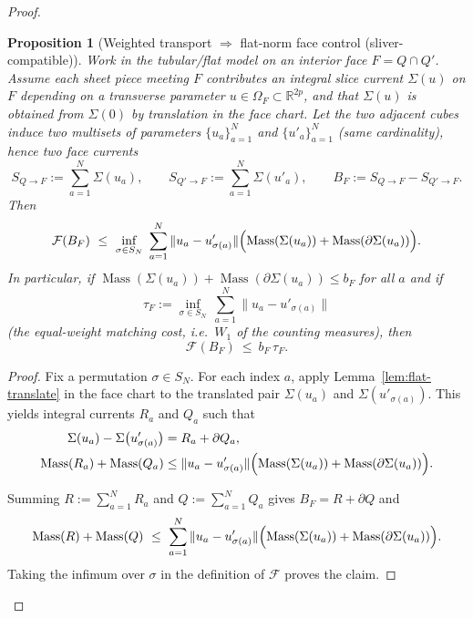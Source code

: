 \documentclass[11pt]{article}
\numberwithin{equation}{section}  %
\theoremstyle{plain}
\newtheorem{proposition}[theorem]{Proposition}
\theoremstyle{definition}
\theoremstyle{remark}
\newcommand{\R}{\mathbb{R}}
\DeclareMathOperator{\Mass}{Mass}
\begin{document}
\begin{proof}


\begin{proposition}[Weighted transport $\Rightarrow$ flat-norm face control (sliver-compatible)]\label{prop:transport-flat-glue-weighted}
Work in the tubular/flat model on an interior face $F=Q\cap Q'$.
Assume each sheet piece meeting $F$ contributes an integral slice current $\Sigma(u)$ on $F$ depending on a transverse parameter
$u\in\Omega_F\subset\R^{2p}$, and that $\Sigma(u)$ is obtained from $\Sigma(0)$ by translation in the face chart.
Let the two adjacent cubes induce two multisets of parameters $\{u_a\}_{a=1}^N$ and $\{u'_a\}_{a=1}^N$ (same cardinality), hence two face currents
\[
S_{Q\to F}:=\sum_{a=1}^N \Sigma(u_a),\qquad
S_{Q'\to F}:=\sum_{a=1}^N \Sigma(u'_a),
\qquad
B_F:=S_{Q\to F}-S_{Q'\to F}.
\]
Then
\[
\mathcal F(B_F)\ \le\ \inf_{\sigma\in S_N}\ \sum_{a=1}^N \|u_a-u'_{\sigma(a)}\|\Bigl(\Mass(\Sigma(u_a))+\Mass(\partial\Sigma(u_a))\Bigr).
\]
In particular, if $\Mass(\Sigma(u_a))+\Mass(\partial\Sigma(u_a))\le b_F$ for all $a$ and if
\[
\tau_F:=\inf_{\sigma\in S_N}\ \sum_{a=1}^N \|u_a-u'_{\sigma(a)}\|
\]
(the equal-weight matching cost, i.e.\ $W_1$ of the counting measures), then
\[
\mathcal F(B_F)\ \le\ b_F\,\tau_F.
\]
\end{proposition}


\begin{proof}
Fix a permutation $\sigma\in S_N$.
For each index $a$, apply Lemma~\ref{lem:flat-translate} in the face chart to the translated pair
$\Sigma(u_a)$ and $\Sigma(u'_{\sigma(a)})$.
This yields integral currents $R_a$ and $Q_a$ such that
\[
\begin{aligned}
	\Sigma(u_a)-\Sigma\bigl(u'_{\sigma(a)}\bigr) &= R_a+\partial Q_a, \\
	\Mass(R_a)+\Mass(Q_a)
	&\le \|u_a-u'_{\sigma(a)}\|
	\Bigl(\Mass(\Sigma(u_a))+\Mass(\partial\Sigma(u_a))\Bigr).
\end{aligned}
\]

Summing $R:=\sum_{a=1}^N R_a$ and $Q:=\sum_{a=1}^N Q_a$ gives $B_F=R+\partial Q$ and
\[
\Mass(R)+\Mass(Q)\ \le\ \sum_{a=1}^N \|u_a-u'_{\sigma(a)}\|\Bigl(\Mass(\Sigma(u_a))+\Mass(\partial\Sigma(u_a))\Bigr).
\]
Taking the infimum over $\sigma$ in the definition of $\mathcal F$ proves the claim.
\end{proof}







\end{proof}
\end{document}
